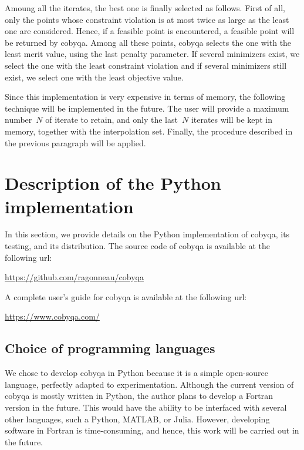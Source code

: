 Amoung all the iterates, the best one is finally selected as follows.
First of all, only the points whose constraint violation is at most twice as large as the least one are considered.
Hence, if a feasible point is encountered, a feasible point will be returned by \gls{cobyqa}.
Among all these points, \gls{cobyqa} selects the one with the least merit value, using the last penalty parameter.
If several minimizers exist, we select the one with the least constraint violation and if several minimizers still exist, we select one with the least objective value.

Since this implementation is very expensive in terms of memory, the following technique will be implemented in the future.
The user will provide a maximum number~$N$ of iterate to retain, and only the last~$N$ iterates will be kept in memory, together with the interpolation set.
Finally, the procedure described in the previous paragraph will be applied.

\section{Description of the Python implementation}
\label{sec:python-implementation}

In this section, we provide details on the Python implementation of \gls{cobyqa}, its testing, and its distribution.
The source code of \gls{cobyqa} is available at the following url:
\begin{center}
    \url{https://github.com/ragonneau/cobyqa}
\end{center}
A complete user's guide for \gls{cobyqa} is available at the following url:
\begin{center}
    \url{https://www.cobyqa.com/}
\end{center}

\subsection{Choice of programming languages}

We chose to develop \gls{cobyqa} in Python because it is a simple open-source language, perfectly adapted to experimentation.
Although the current version of \gls{cobyqa} is mostly written in Python, the author plans to develop a Fortran version in the future.
This would have the ability to be interfaced with several other languages, such a Python, MATLAB, or Julia.
However, developing software in Fortran is time-consuming, and hence, this work will be carried out in the future.

